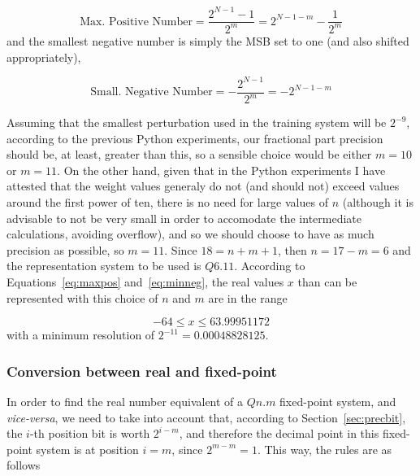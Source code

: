\begin{equation}\label{eq:maxpos}
    \text{Max. Positive Number} = \frac{2^{N-1}-1}{2^m} = 2^{N-1-m} - \frac{1}{2^m}
\end{equation}
and the smallest negative number is simply the MSB set to one (and also shifted appropriately),

\begin{equation}\label{eq:minneg}
    \text{Small. Negative Number} = -\frac{2^{N-1}}{2^m} = -2^{N-1-m}
\end{equation}

Assuming that the smallest perturbation used in the training system will be $2^{-9}$, according to the previous Python experiments, our fractional part precision should be, at least, greater than this, so a sensible choice would be either $m=10$ or $m=11$. On the other hand, given that in the Python experiments I have attested that the weight values generaly do not (and should not) exceed values around the first power of ten, there is no need for large values of $n$ (although it is advisable to not be very small in order to accomodate the intermediate calculations, avoiding overflow), and so we should choose to have as much precision as possible, so $m=11$. Since $18=n+m+1$, then $n = 17 - m = 6$ and the representation system to be used is $Q6.11$. According to Equations~\ref{eq:maxpos} and~\ref{eq:minneg}, the real values $x$ than can be represented with this choice of $n$ and $m$ are in the range 

\begin{equation}\label{eq:rangeQ611}
    -64 \leq x \leq 63.99951172
\end{equation}
with a minimum resolution of $2^{-11} = 0.00048828125$.

\subsubsection{Conversion between real and fixed-point}\label{sec:convrulesfp}
In order to find the real number equivalent of a $Qn.m$ fixed-point system, and \textit{vice-versa}, we need to take into account that, according to Section~\ref{sec:precbit}, the $i$-th position bit is worth $2^{i-m}$, and therefore the decimal point in this fixed-point system is at position $i=m$, since $2^{m-m} = 1$. This way, the rules are as follows

